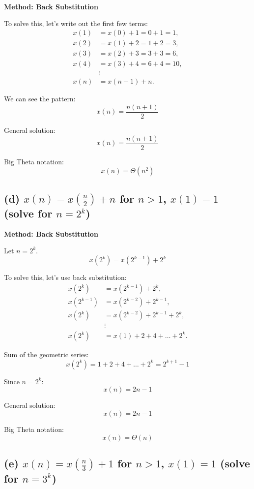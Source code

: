 \documentclass{article}
\begin{document}
\textbf{Method: Back Substitution}

To solve this, let's write out the first few terms:
\begin{align*}
x(1) &= x(0) + 1 = 0 + 1 = 1, \\
x(2) &= x(1) + 2 = 1 + 2 = 3, \\
x(3) &= x(2) + 3 = 3 + 3 = 6, \\
x(4) &= x(3) + 4 = 6 + 4 = 10, \\
&\vdots \\
x(n) &= x(n-1) + n.
\end{align*}

We can see the pattern:
\[ x(n) = \frac{n(n+1)}{2} \]

General solution:
\[ x(n) = \frac{n(n+1)}{2} \]

Big Theta notation:
\[ x(n) = \Theta(n^2) \]

\subsection*{(d) \( x(n) = x \left( \frac{n}{2} \right) + n \) for \( n > 1 \), \( x(1) = 1 \) (solve for \( n = 2^k \))}

\textbf{Method: Back Substitution}

Let \( n = 2^k \).
\[ x(2^k) = x(2^{k-1}) + 2^k \]

To solve this, let's use back substitution:
\begin{align*}
x(2^k) &= x(2^{k-1}) + 2^k, \\
x(2^{k-1}) &= x(2^{k-2}) + 2^{k-1}, \\
x(2^k) &= x(2^{k-2}) + 2^{k-1} + 2^k, \\
&\vdots \\
x(2^k) &= x(1) + 2 + 4 + \ldots + 2^k.
\end{align*}

Sum of the geometric series:
\[ x(2^k) = 1 + 2 + 4 + \ldots + 2^k = 2^{k+1} - 1 \]

Since \( n = 2^k \):
\[ x(n) = 2n - 1 \]

General solution:
\[ x(n) = 2n - 1 \]

Big Theta notation:
\[ x(n) = \Theta(n) \]

\subsection*{(e) \( x(n) = x \left( \frac{n}{3} \right) + 1 \) for \( n > 1 \), \( x(1) = 1 \) (solve for \( n = 3^k \))}
\end{document}
